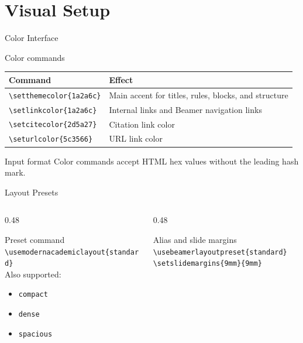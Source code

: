 \documentclass[aspectratio=169,10pt]{beamer}
\begin{document}
\section{Visual Setup}

\begin{academicframe}{Color Interface}
  \begin{block}{Color commands}
    \scriptsize
    \begin{tabular}{ll}
      \toprule
      Command & Effect \\
      \midrule
      \texttt{\textbackslash setthemecolor\{1a2a6c\}} & Main accent for titles, rules, blocks, and structure \\
      \texttt{\textbackslash setlinkcolor\{1a2a6c\}} & Internal links and Beamer navigation links \\
      \texttt{\textbackslash setcitecolor\{2d5a27\}} & Citation link color \\
      \texttt{\textbackslash seturlcolor\{5c3566\}} & URL link color \\
      \bottomrule
    \end{tabular}
  \end{block}

  \vspace{0.45em}
  \begin{alertblock}{Input format}
    \small
    Color commands accept HTML hex values without the leading hash mark.
  \end{alertblock}
\end{academicframe}

\begin{academicframe}{Layout Presets}
  \begin{columns}[T,onlytextwidth]
    \begin{column}{0.48\textwidth}
      \begin{block}{Preset command}
        \scriptsize
        \texttt{\textbackslash usemodernacademiclayout\{standard\}}\\[0.6em]
        Also supported:
        \begin{itemize}
          \item \texttt{compact}
          \item \texttt{dense}
          \item \texttt{spacious}
        \end{itemize}
      \end{block}
    \end{column}
    \begin{column}{0.48\textwidth}
      \begin{exampleblock}{Alias and slide margins}
        \scriptsize
        \texttt{\textbackslash usebeamerlayoutpreset\{standard\}}\\[0.5em]
        \texttt{\textbackslash setslidemargins\{9mm\}\{9mm\}}
      \end{exampleblock}
    \end{column}
  \end{columns}
\end{academicframe}
\end{document}
